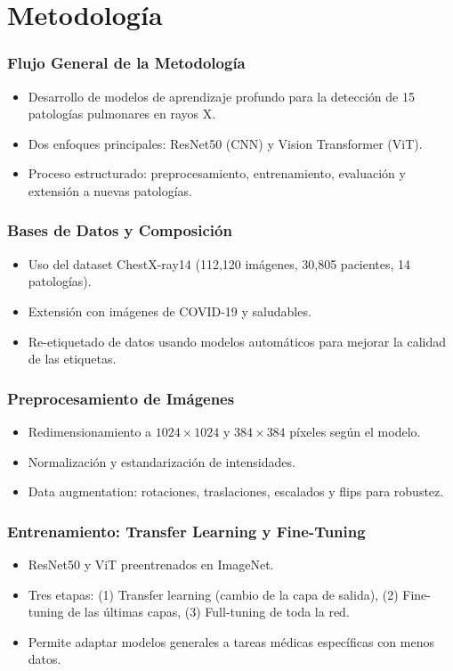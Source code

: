 
\section{Metodología}

\begin{frame}
\frametitle{Flujo General de la Metodología}
\begin{itemize}
    \item Desarrollo de modelos de aprendizaje profundo para la detección de 15 patologías pulmonares en rayos X.
    \item Dos enfoques principales: ResNet50 (CNN) y Vision Transformer (ViT).
    \item Proceso estructurado: preprocesamiento, entrenamiento, evaluación y extensión a nuevas patologías.
\end{itemize}
\end{frame}

\begin{frame}
\frametitle{Bases de Datos y Composición}
\begin{itemize}
    \item Uso del dataset ChestX-ray14 (112,120 imágenes, 30,805 pacientes, 14 patologías).
    \item Extensión con imágenes de COVID-19 y saludables.
    \item Re-etiquetado de datos usando modelos automáticos para mejorar la calidad de las etiquetas.
\end{itemize}
\end{frame}

\begin{frame}
\frametitle{Preprocesamiento de Imágenes}
\begin{itemize}
    \item Redimensionamiento a $1024 \times 1024$ y $384 \times 384$ píxeles según el modelo.
    \item Normalización y estandarización de intensidades.
    \item Data augmentation: rotaciones, traslaciones, escalados y flips para robustez.
\end{itemize}
\end{frame}

\begin{frame}
\frametitle{Entrenamiento: Transfer Learning y Fine-Tuning}
\begin{itemize}
    \item ResNet50 y ViT preentrenados en ImageNet.
    \item Tres etapas: (1) Transfer learning (cambio de la capa de salida), (2) Fine-tuning de las últimas capas, (3) Full-tuning de toda la red.
    \item Permite adaptar modelos generales a tareas médicas específicas con menos datos.
\end{itemize}
\end{frame}

